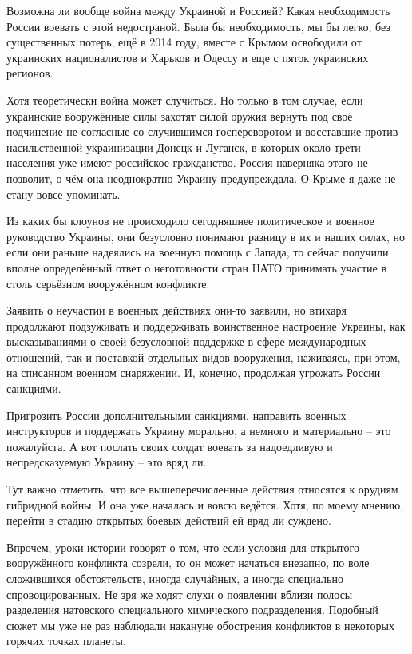 Возможна ли вообще война между Украиной и Россией? Какая необходимость России
воевать с этой недостраной. Была бы необходимость, мы бы легко, без
существенных потерь, ещё в 2014 году, вместе с Крымом освободили от украинских
националистов и Харьков и Одессу и еще с пяток украинских регионов.

Хотя теоретически война может случиться. Но только в том случае, если
украинские вооружённые силы захотят силой оружия вернуть под своё подчинение не
согласные со случившимся госпереворотом и восставшие против насильственной
украинизации Донецк и Луганск, в которых около трети населения уже имеют
российское гражданство. Россия наверняка этого не позволит, о чём она
неоднократно Украину предупреждала. О Крыме я даже не стану вовсе упоминать.

Из каких бы клоунов не происходило сегодняшнее политическое и военное
руководство Украины, они безусловно понимают разницу в их и наших силах, но
если они раньше надеялись на военную помощь с Запада, то сейчас получили вполне
определённый ответ о неготовности стран НАТО принимать участие в столь
серьёзном вооружённом конфликте.

Заявить о неучастии в военных действиях они-то заявили, но втихаря продолжают
подзуживать и поддерживать воинственное настроение Украины, как высказываниями
о своей безусловной поддержке в сфере международных отношений, так и поставкой
отдельных видов вооружения, наживаясь, при этом, на списанном военном
снаряжении. И, конечно, продолжая угрожать России санкциями.

Пригрозить России дополнительными санкциями, направить военных инструкторов и
поддержать Украину морально, а немного и материально – это пожалуйста. А вот
послать своих солдат воевать за надоедливую и непредсказуемую Украину – это
вряд ли.

Тут важно отметить, что все вышеперечисленные действия относятся к орудиям
гибридной войны. И она уже началась и вовсю ведётся. Хотя, по моему мнению,
перейти в стадию открытых боевых действий ей вряд ли суждено.

Впрочем, уроки истории говорят о том, что если условия для открытого
вооружённого конфликта созрели, то он может начаться внезапно, по воле
сложившихся обстоятельств, иногда случайных, а иногда специально
спровоцированных. Не зря же ходят слухи о появлении вблизи полосы разделения
натовского специального химического подразделения. Подобный сюжет мы уже не раз
наблюдали накануне обострения конфликтов в некоторых горячих точках планеты.

